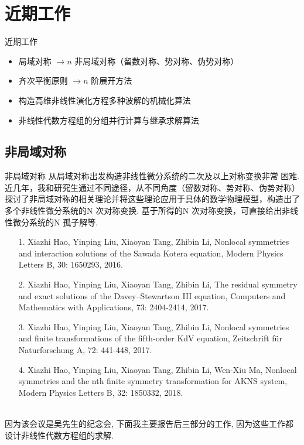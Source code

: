 \documentclass{beamer}
\begin{document}
\section{近期工作}
\begin{frame}{近期工作}
\begin{itemize}
  \item  局域对称 $\rightarrow n$ 非局域对称（留数对称、势对称、伪势对称）
  \item  齐次平衡原则 $\rightarrow n$ 阶展开方法
  \item  构造高维非线性演化方程多种波解的机械化算法 
  \item  非线性代数方程组的分组并行计算与继承求解算法
\end{itemize}
\end{frame}

\subsection{非局域对称}
\begin{frame}{非局域对称}
  从局域对称出发构造非线性微分系统的二次及以上对称变换非常
  困难. 近几年，我和研究生通过不同途径，从不同角度（留数对称、势对称、伪势对称）探讨了非局域对称的相关理论并将这些理论应用于具体的数学物理模型，构造出了多个非线性微分系统的N 次对称变换. 基于所得的N 次对称变换，可直接给出非线性微分系统的N 孤子解等.
  \begin{itemize}
    \item[1.] Xiazhi Hao, Yinping Liu, Xiaoyan Tang, Zhibin Li, Nonlocal symmetries and interaction solutions of the Sawada Kotera equation, Modern Physics Letters B, 30:
    1650293, 2016.
    \item[2.] Xiazhi Hao, Yinping Liu, Xiaoyan Tang, Zhibin Li, The residual symmetry and exact solutions of the Davey–Stewartson III equation, Computers and Mathematics
    with Applications, 73: 2404-2414, 2017.
    \item[3.] Xiazhi Hao, Yinping Liu, Xiaoyan Tang, Zhibin Li, Nonlocal symmetries and finite transformations of the fifth-order KdV equation, Zeitschrift für Naturforschung
    A, 72: 441-448, 2017.
  \end{itemize}
\end{frame}
\begin{frame}
  \begin{itemize}
    \item[4.] Xiazhi Hao, Yinping Liu, Xiaoyan Tang, Zhibin Li, Wen-Xiu Ma, Nonlocal symmetries and the nth finite symmetry transformation for AKNS system, Modern
    Physics Letters B, 32: 1850332, 2018.
  \end{itemize}
\mbox{} \\
    因为该会议是吴先生的纪念会, 下面我主要报告后三部分的工作, 因为这些工作都设计非线性代数方程组的求解. 
\end{frame}
\end{document}

